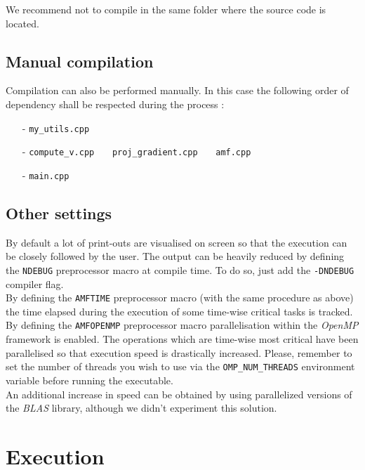 \documentclass[paper=a4, fontsize=12pt]{scrartcl} %
\numberwithin{equation}{section} %
\numberwithin{figure}{section} %
\numberwithin{table}{section} %
\begin{document}
We recommend not to compile in the same folder where the source code is located. 

\subsection{Manual compilation}

Compilation can also be performed manually. In this case the following order of dependency shall be respected during the process :
\begin{itemize}
\item[-] \texttt{my\_utils.cpp}
\item[-] \texttt{compute\_v.cpp} \, \, \, \texttt{proj\_gradient.cpp} \, \, \, \texttt{amf.cpp}
\item[-] \texttt{main.cpp}

\end{itemize}

\subsection{Other settings}

By default a lot of print-outs are visualised on screen so that the execution can be closely followed by the user. The output can be heavily reduced by defining the \texttt{NDEBUG} preprocessor macro at compile time. To do so, just add the \texttt{-DNDEBUG} compiler flag. \\

By defining the \texttt{AMFTIME} preprocessor macro (with the same procedure as above) the time elapsed during the execution of some time-wise critical tasks is tracked. \\

By defining the \texttt{AMFOPENMP} preprocessor macro parallelisation within the \emph{OpenMP} framework is enabled. The operations which are time-wise most critical have been parallelised so that execution speed is drastically increased. Please, remember to set the number of threads you wish to use via the \texttt{OMP\_NUM\_THREADS} environment variable before running the executable. \\

An additional increase in speed can be obtained by using parallelized versions of the \emph{BLAS} library, although we didn't experiment this solution.

\section{Execution}
\end{document}
